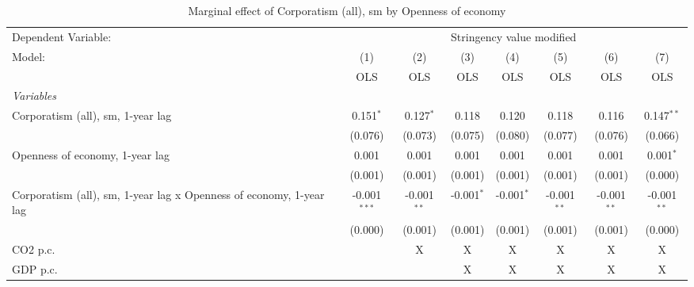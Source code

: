
\begin{table}[htbp]
   \caption{Marginal effect of Corporatism (all), sm by Openness of economy}
   \centering
   \begin{tabular}{lccccccc}
      \toprule
      Dependent Variable: & \multicolumn{7}{c}{Stringency value modified}\\
      Model:                                                              & (1)            & (2)           & (3)          & (4)          & (5)           & (6)           & (7)\\  
                                                                          &  OLS           & OLS           & OLS          & OLS          & OLS           & OLS           & OLS\\  
      \midrule
      \emph{Variables}\\
      Corporatism (all), sm, 1-year lag                                   & 0.151$^{*}$    & 0.127$^{*}$   & 0.118        & 0.120        & 0.118         & 0.116         & 0.147$^{**}$\\   
                                                                          & (0.076)        & (0.073)       & (0.075)      & (0.080)      & (0.077)       & (0.076)       & (0.066)\\   
      Openness of economy, 1-year lag                                     & 0.001          & 0.001         & 0.001        & 0.001        & 0.001         & 0.001         & 0.001$^{*}$\\   
                                                                          & (0.001)        & (0.001)       & (0.001)      & (0.001)      & (0.001)       & (0.001)       & (0.000)\\   
      Corporatism (all), sm, 1-year lag x Openness of economy, 1-year lag & -0.001$^{***}$ & -0.001$^{**}$ & -0.001$^{*}$ & -0.001$^{*}$ & -0.001$^{**}$ & -0.001$^{**}$ & -0.001$^{**}$\\   
                                                                          & (0.000)        & (0.001)       & (0.001)      & (0.001)      & (0.001)       & (0.001)       & (0.000)\\   
      CO2 p.c.                                                            &                & X             & X            & X            & X             & X             & X\\  
      GDP p.c.                                                            &                &               & X            & X            & X             & X             & X\\  

\end{tabular}
\end{table}
